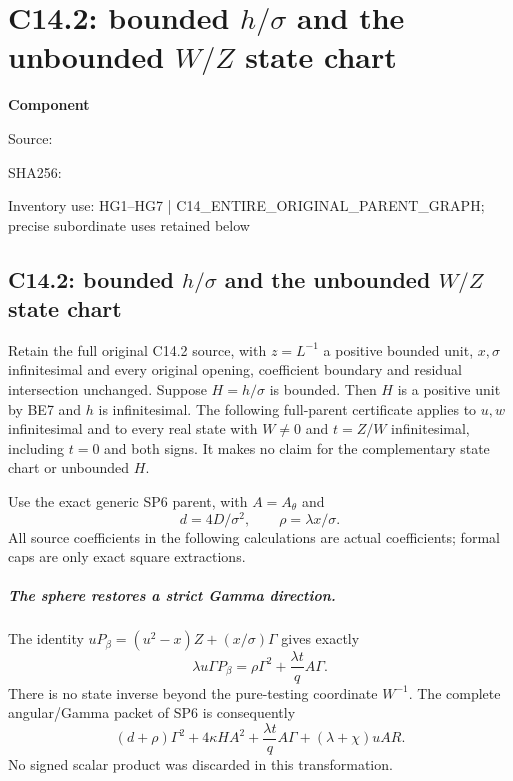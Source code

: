 \chapter{C14.2: bounded $h/\sigma$ and the unbounded $W/Z$ state chart}
\label{component:pcb3428d66a71}
\noindent\textbf{Component }\par
{\small\noindent Source: \par}
{\small\noindent SHA256: \par}
{\small\noindent Inventory use: HG1--HG7 | C14\_\allowbreak{}ENTIRE\_\allowbreak{}ORIGINAL\_\allowbreak{}PARENT\_\allowbreak{}GRAPH; precise subordinate uses retained below\par}
\medskip
\section{C14.2: bounded $h/\sigma$ and the unbounded $W/Z$ state chart}
\label{pcb3428d66a71:sec:r19-c142-bounded-H}

Retain the full original C14.2 source, with $z=L^{-1}$ a positive
bounded unit, $x,\sigma$ infinitesimal and every original opening,
coefficient boundary and residual intersection unchanged.  Suppose
$H=h/\sigma$ is bounded.  Then $H$ is a positive unit by BE7 and
$h$ is infinitesimal.  The following full-parent certificate applies
to $u,w$ infinitesimal and to every real state with $W\ne0$ and
$t=Z/W$ infinitesimal, including $t=0$ and both signs.  It makes
no claim for the complementary state chart or unbounded $H$.

Use the exact generic SP6 parent, with $A=A_\theta$ and
\[
 d=4D/\sigma^2,\qquad \rho=\lambda x/\sigma.
\]
All source coefficients in the following calculations are actual
coefficients; formal caps are only exact square extractions.

\paragraph{The sphere restores a strict Gamma direction.}
The identity $uP_\beta=(u^2-x)Z+(x/\sigma)\Gamma$ gives exactly
\[
 \lambda u\Gamma P_\beta
       =\rho\Gamma^2+\frac{\lambda t}{q}A\Gamma.
 \tag{HG1}
\]
There is no state inverse beyond the pure-testing coordinate $W^{-1}$.
The complete angular/Gamma packet of SP6 is consequently
\[
 (d+\rho)\Gamma^2+4\kappa H A^2
       +\frac{\lambda t}{q}A\Gamma
       +(\lambda+\chi)uAR.
 \tag{HG2}
\]
No signed scalar product was discarded in this transformation.

